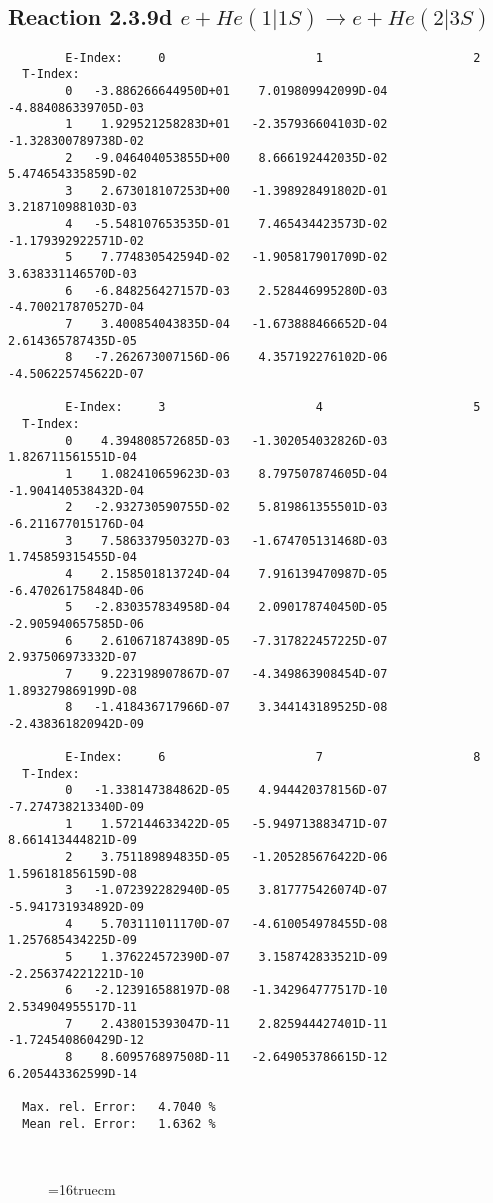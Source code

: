 \documentclass[12pt]{article}
\begin{document}
\subsection{
Reaction 2.3.9d $ e + He(1|1S) \rightarrow e + He(2|3S) $
}




\begin{small}\begin{verbatim}
        E-Index:     0                     1                     2
  T-Index:
        0   -3.886266644950D+01    7.019809942099D-04   -4.884086339705D-03
        1    1.929521258283D+01   -2.357936604103D-02   -1.328300789738D-02
        2   -9.046404053855D+00    8.666192442035D-02    5.474654335859D-02
        3    2.673018107253D+00   -1.398928491802D-01    3.218710988103D-03
        4   -5.548107653535D-01    7.465434423573D-02   -1.179392922571D-02
        5    7.774830542594D-02   -1.905817901709D-02    3.638331146570D-03
        6   -6.848256427157D-03    2.528446995280D-03   -4.700217870527D-04
        7    3.400854043835D-04   -1.673888466652D-04    2.614365787435D-05
        8   -7.262673007156D-06    4.357192276102D-06   -4.506225745622D-07

        E-Index:     3                     4                     5
  T-Index:
        0    4.394808572685D-03   -1.302054032826D-03    1.826711561551D-04
        1    1.082410659623D-03    8.797507874605D-04   -1.904140538432D-04
        2   -2.932730590755D-02    5.819861355501D-03   -6.211677015176D-04
        3    7.586337950327D-03   -1.674705131468D-03    1.745859315455D-04
        4    2.158501813724D-04    7.916139470987D-05   -6.470261758484D-06
        5   -2.830357834958D-04    2.090178740450D-05   -2.905940657585D-06
        6    2.610671874389D-05   -7.317822457225D-07    2.937506973332D-07
        7    9.223198907867D-07   -4.349863908454D-07    1.893279869199D-08
        8   -1.418436717966D-07    3.344143189525D-08   -2.438361820942D-09

        E-Index:     6                     7                     8
  T-Index:
        0   -1.338147384862D-05    4.944420378156D-07   -7.274738213340D-09
        1    1.572144633422D-05   -5.949713883471D-07    8.661413444821D-09
        2    3.751189894835D-05   -1.205285676422D-06    1.596181856159D-08
        3   -1.072392282940D-05    3.817775426074D-07   -5.941731934892D-09
        4    5.703111011170D-07   -4.610054978455D-08    1.257685434225D-09
        5    1.376224572390D-07    3.158742833521D-09   -2.256374221221D-10
        6   -2.123916588197D-08   -1.342964777517D-10    2.534904955517D-11
        7    2.438015393047D-11    2.825944427401D-11   -1.724540860429D-12
        8    8.609576897508D-11   -2.649053786615D-12    6.205443362599D-14

  Max. rel. Error:   4.7040 %
  Mean rel. Error:   1.6362 %



\end{verbatim}\end{small}
\begin{figure} \label{2.3.9d}
\epsfxsize=16truecm
\end{figure}
\newpage
\end{document}
